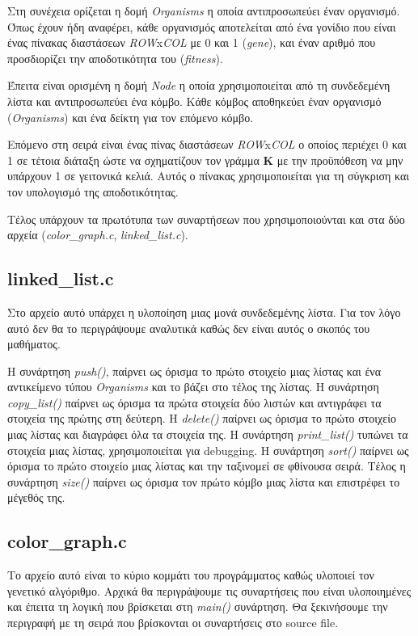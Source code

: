 \documentclass{article}
\begin{document}
Στη συνέχεια ορίζεται η δομή \emph{Organisms} η οποία αντιπροσωπεύει έναν
οργανισμό. Όπως έχουν ήδη αναφέρει, κάθε οργανισμός αποτελείται από ένα γονίδιο
που είναι ένας πίνακας διαστάσεων \emph{ROW}x\emph{COL} με 0 και 1 (\emph{gene}),
και έναν αριθμό που προσδιορίζει την αποδοτικότητα του (\emph{fitness}).

Έπειτα είναι ορισμένη η δομή \emph{Node} η οποία χρησιμοποιείται από τη
συνδεδεμένη λίστα και αντιπροσωπεύει ένα κόμβο. Κάθε κόμβος αποθηκεύει έναν
οργανισμό (\emph{Organisms}) και ένα δείκτη για τον επόμενο κόμβο.

Επόμενο στη σειρά είναι ένας πίνας διαστάσεων \emph{ROW}x\emph{COL} ο οποίος
περιέχει 0 και 1 σε τέτοια διάταξη ώστε να σχηματίζουν τον γράμμα \textbf{K} με
την προϋπόθεση να μην υπάρχουν 1 σε γειτονικά κελιά. Αυτός ο πίνακας
χρησιμοποιείται για τη σύγκριση και τον υπολογισμό της αποδοτικότητας.

Τέλος υπάρχουν τα πρωτότυπα των συναρτήσεων που χρησιμοποιούνται και στα δύο
αρχεία (\emph{color\_graph.c}, \emph{linked\_list.c}).

\subsection{linked\_list.c}
Στο αρχείο αυτό υπάρχει η υλοποίηση μιας μονά συνδεδεμένης λίστα. Για τον λόγο
αυτό δεν θα το περιγράψουμε αναλυτικά καθώς δεν είναι αυτός ο σκοπός του
μαθήματος.

Η συνάρτηση \emph{push()}, παίρνει ως όρισμα το πρώτο στοιχείο μιας λίστας και
ένα αντικείμενο τύπου \emph{Organisms} και το βάζει στο τέλος της λίστας. Η
συνάρτηση \emph{copy\_list()} παίρνει ως όρισμα τα πρώτα στοιχεία δύο λιστών και
αντιγράφει τα στοιχεία της πρώτης στη δεύτερη. Η \emph{delete()} παίρνει ως
όρισμα το πρώτο στοιχείο μιας λίστας και διαγράφει όλα τα στοιχεία της. Η
συνάρτηση \emph{print\_list()} τυπώνει τα στοιχεία μιας λίστας, χρησιμοποιείται
για debugging. Η συνάρτηση \emph{sort()} παίρνει ως όρισμα το πρώτο στοιχείο
μιας λίστας και την ταξινομεί σε φθίνουσα σειρά. Τέλος η συνάρτηση \emph{size()}
παίρνει ως όρισμα τον πρώτο κόμβο μιας λίστα και επιστρέφει το μέγεθός της.

\subsection{color\_graph.c}
Το αρχείο αυτό είναι το κύριο κομμάτι του προγράμματος καθώς υλοποιεί τον
γενετικό αλγόριθμο. Αρχικά θα περιγράψουμε τις συναρτήσεις που είναι
υλοποιημένες και έπειτα τη λογική που βρίσκεται στη \emph{main()} συνάρτηση. Θα
ξεκινήσουμε την περιγραφή με τη σειρά που βρίσκονται οι συναρτήσεις στο source
file.
\end{document}
